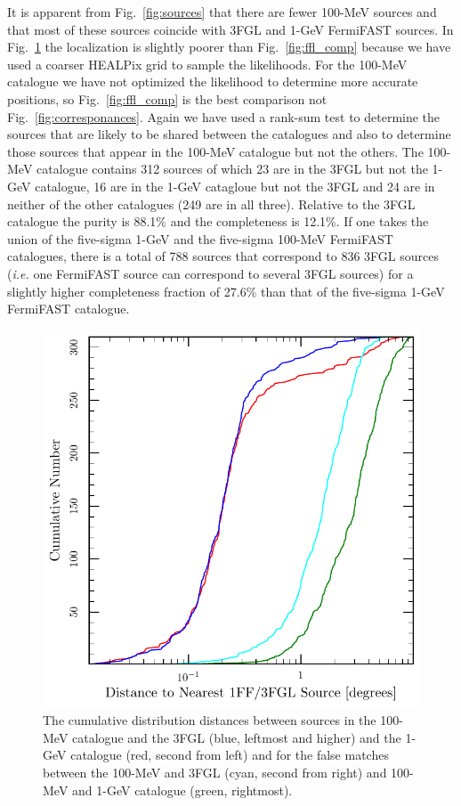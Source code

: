 \documentclass[useAMS,usenatbib]{mn2e}
\begin{document}
It is apparent from Fig.~\ref{fig:sources} that there are fewer
100-MeV sources and that most of these sources coincide with 3FGL and
1-GeV FermiFAST sources.  In Fig.~\ref{fig:cum0.1GeV} the localization is
slightly poorer than Fig.~\ref{fig:ffl_comp} because we have used a
coarser HEALPix grid to sample the likelihoods. For the 100-MeV
catalogue we have not optimized the likelihood to determine more
accurate positions, so Fig.~\ref{fig:ffl_comp} is the best comparison
not Fig.~\ref{fig:corresponances}.  Again we have used a rank-sum test
to determine the sources that are likely to be shared between the
catalogues and also to determine those sources that appear in the
100-MeV catalogue but not the others.  The 100-MeV catalogue contains
312 sources of which 23 are in the 3FGL but not the 1-GeV catalogue,
16 are in the 1-GeV catagloue but not the 3FGL and 24 are in neither
of the other catalogues (249 are in all three). Relative to the 3FGL catalogue
the purity is 88.1\% and the completeness is 12.1\%. If one takes the
union of the five-sigma 1-GeV and the five-sigma 100-MeV FermiFAST
catalogues, there is a total of 788 sources that correspond to 836
3FGL sources ({\em i.e.} one FermiFAST source can correspond to
several 3FGL sources) for a slightly higher completeness fraction of
27.6\% than that of the five-sigma 1-GeV FermiFAST catalogue.

\begin{figure}
  \includegraphics[width=\columnwidth]{cum0p1GeV}
  \caption{The cumulative distribution distances between sources in
    the 100-MeV catalogue and the 3FGL (blue, leftmost and higher) and
    the 1-GeV catalogue (red, second from left) and for the false
    matches between the 100-MeV and 3FGL (cyan, second from right) and
    100-MeV and 1-GeV catalogue (green, rightmost).}
  \label{fig:cum0.1GeV}
\end{figure}
\end{document}
